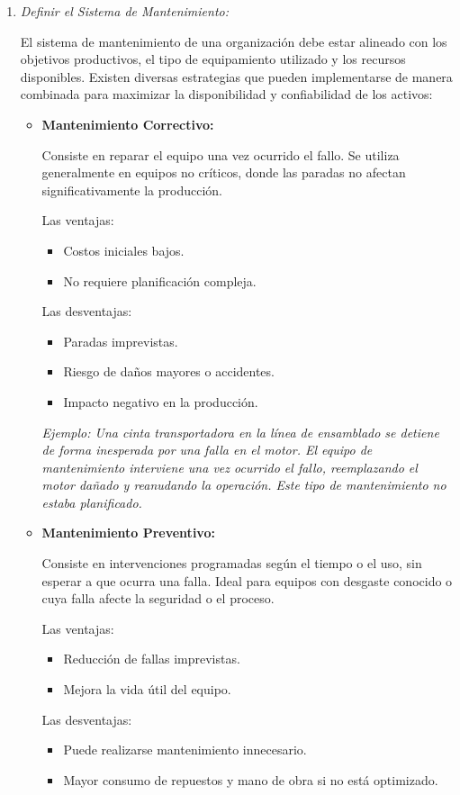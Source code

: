 \documentclass[a4paper,oneside,11pt]{article}
\begin{document}
\begin{enumerate}
    \item \textit{Definir el Sistema de Mantenimiento:}
    
    El sistema de mantenimiento de una organización debe estar alineado con los objetivos productivos, el tipo de equipamiento utilizado y los recursos disponibles. Existen diversas estrategias que pueden implementarse de manera combinada para maximizar la disponibilidad y confiabilidad de los activos:
    \begin{itemize}
        \item \textbf{Mantenimiento Correctivo:}

        Consiste en reparar el equipo una vez ocurrido el fallo. Se utiliza generalmente en equipos no críticos, donde las paradas no afectan significativamente la producción.
        
        Las ventajas:
        \begin{itemize}
            \item Costos iniciales bajos.
            \item No requiere planificación compleja.
        \end{itemize}
        Las desventajas:
        \begin{itemize}
            \item Paradas imprevistas.
            \item Riesgo de daños mayores o accidentes.
            \item Impacto negativo en la producción.
        \end{itemize}
        
        \textit{Ejemplo: Una cinta transportadora en la línea de ensamblado se detiene de forma inesperada por una falla en el motor. El equipo de mantenimiento interviene una vez ocurrido el fallo, reemplazando el motor dañado y reanudando la operación. Este tipo de mantenimiento no estaba planificado.}
        
        \item \textbf{Mantenimiento Preventivo:}

        Consiste en intervenciones programadas según el tiempo o el uso, sin esperar a que ocurra una falla. Ideal para equipos con desgaste conocido o cuya falla afecte la seguridad o el proceso.

        Las ventajas:
        \begin{itemize}
            \item Reducción de fallas imprevistas.
            \item Mejora la vida útil del equipo.
        \end{itemize}
        Las desventajas:
        \begin{itemize}
            \item Puede realizarse mantenimiento innecesario.
            \item Mayor consumo de repuestos y mano de obra si no está optimizado.
        \end{itemize}


\end{itemize}
\end{enumerate}
\end{document}
